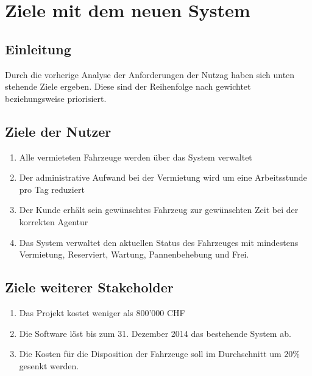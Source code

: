 \section{Ziele mit dem neuen System}
\subsection{Einleitung}
Durch die vorherige Analyse der Anforderungen der Nutzag haben sich unten stehende Ziele ergeben. Diese sind der Reihenfolge nach gewichtet beziehungsweise priorisiert.

\subsection{Ziele der Nutzer}
\begin{enumerate}

\item Alle vermieteten Fahrzeuge werden über das System verwaltet
\item Der administrative Aufwand bei der Vermietung wird um eine Arbeitsstunde pro Tag reduziert
\item Der Kunde erhält sein gewünschtes Fahrzeug zur gewünschten Zeit bei der korrekten Agentur
\item Das System verwaltet den aktuellen Status des Fahrzeuges mit mindestens Vermietung, Reserviert, Wartung, Pannenbehebung und Frei.
\end{enumerate} 

\subsection{Ziele weiterer Stakeholder}
\begin{enumerate}

\item Das Projekt kostet weniger als 800'000 CHF
\item Die Software löst bis zum 31. Dezember 2014 das bestehende System ab.
\item Die Kosten für die Disposition der Fahrzeuge soll im Durchschnitt um 20\% gesenkt werden.

\end{enumerate}
